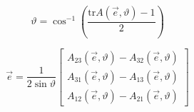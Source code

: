 \begin{center}
	\begin{minipage}[t]{0.45\textwidth}
		\vspace{-1.5mm}
		\begin{equation}
			\vartheta = \cos^{-1} \left( \frac{\text{tr} A(\vec{e}, \vartheta) - 1}{2} \right)
		\end{equation}
	\end{minipage}
	\hfill
	\begin{minipage}[t]{0.52\textwidth}
		\vspace*{-4mm} %
		\begin{equation}
			\vec{e} = \frac{1}{2 \sin \vartheta}
			\begin{bmatrix}
				A_{23}(\vec{e}, \vartheta) - A_{32}(\vec{e}, \vartheta) \\
				A_{31}(\vec{e}, \vartheta) - A_{13}(\vec{e}, \vartheta) \\
				A_{12}(\vec{e}, \vartheta) - A_{21}(\vec{e}, \vartheta)
			\end{bmatrix}
		\end{equation}
	\end{minipage}
\end{center}

 
 
 
